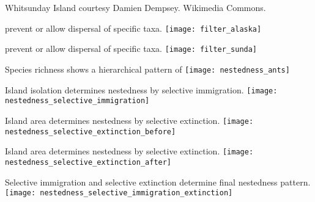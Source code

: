 \documentclass[t]{beamer}
\begin{document}
{
\begin{frame}[b,plain]
	\hfill\color{white}\tiny{Whitsunday Island courtesy Damien Dempsey. Wikimedia Commons.}
\end{frame}
}

\begin{frame}{ prevent or allow dispersal of specific taxa.}
	\centering
		\texttt{[image: filter\_alaska]}\\
\end{frame}

\begin{frame}{ prevent or allow dispersal of specific taxa.}
	\centering
		\texttt{[image: filter\_sunda]}\\
\end{frame}

\begin{frame}{Species richness shows a hierarchical pattern of }
	\centering
		\texttt{[image: nestedness\_ants]} \\
\end{frame}

\begin{frame}{Island isolation determines nestedness by selective immigration.}
	\centering
		\texttt{[image: nestedness\_selective\_immigration]} \\
\end{frame}

\begin{frame}{Island area determines nestedness by selective extinction.}
	\centering
		\texttt{[image: nestedness\_selective\_extinction\_before]} \\
\end{frame}

\begin{frame}{Island area determines nestedness by selective extinction.}
	\centering
		\texttt{[image: nestedness\_selective\_extinction\_after]} \\
\end{frame}

\begin{frame}{Selective immigration and selective extinction determine final nestedness pattern.}
	\centering
		\texttt{[image: nestedness\_selective\_immigration\_extinction]} \\
\end{frame}
\end{document}
